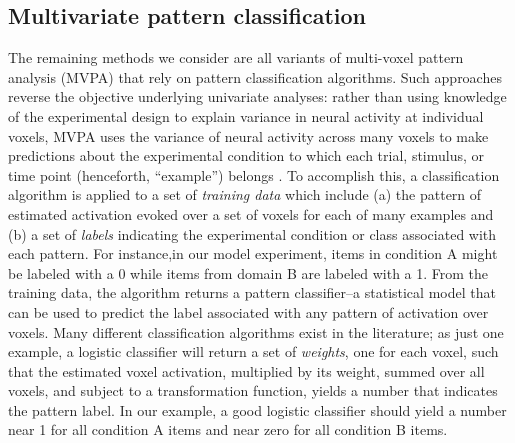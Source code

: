 \subsection{Multivariate pattern classification}

The remaining methods we consider are all variants of multi-voxel pattern analysis (MVPA) that rely on pattern classification algorithms. Such approaches reverse the objective underlying univariate analyses: rather than using knowledge of the experimental design to explain variance in neural activity at individual voxels, MVPA uses the variance of neural activity across many voxels to 
make predictions about the experimental condition to which each trial, stimulus, or time point (henceforth, ``example'') belongs \cite{mitchell_learning_2004, pereira_machine_2009}. To accomplish this, a classification algorithm is applied to a set of {\em training data} which include (a) the pattern of estimated activation evoked over a set of voxels for each of many examples and (b) a set of {\em labels} indicating the experimental condition or class associated with each pattern. For instance,in our model experiment, items in condition A might be labeled with a 0 while items from domain B are labeled with a 1.  From the training data, the algorithm returns a pattern classifier--a statistical model that can be used to predict the label associated with any pattern of activation over voxels. Many different classification algorithms exist in the literature; as just one example, a logistic classifier will return a set of {\em weights}, one for each voxel, such that the estimated voxel activation, multiplied by its weight, summed over all voxels, and subject to a transformation function, yields a number that indicates the pattern label. In our example, a good logistic classifier should yield a number near 1 for all condition A items and near zero for all condition B items.

